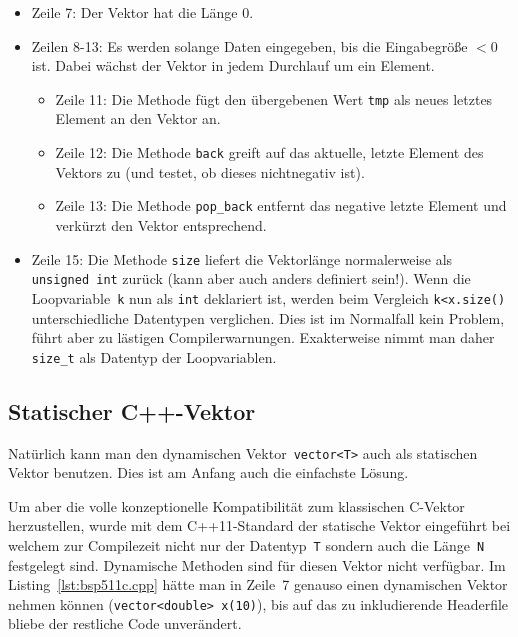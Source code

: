 \begin{itemize}
	\item Zeile 7: Der Vektor hat die Länge 0.
	\item Zeilen 8-13: Es werden solange Daten eingegeben, bis die Eingabegröße $<0$ ist. Dabei wächst der Vektor
	in jedem Durchlauf um ein Element.
	\begin{itemize}
	  \item Zeile 11: Die Methode 
	  fügt den übergebenen Wert \texttt{tmp} als neues letztes Element an den Vektor an.
	  \item Zeile 12: Die Methode \texttt{back} greift auf das aktuelle, letzte Element des Vektors zu (und testet, ob
	  dieses nichtnegativ ist).
	  \item Zeile 13:  Die Methode \texttt{pop\_back} entfernt das negative letzte Element und verkürzt den Vektor
	  entsprechend.
	\end{itemize}
	\item Zeile 15: Die Methode \texttt{size} liefert die Vektorlänge normalerweise als \verb|unsigned int|
	zurück (kann aber auch anders definiert sein!).
	Wenn die Loopvariable~\texttt{k} nun als \verb|int| deklariert ist, werden beim Vergleich \verb|k<x.size()|
	unterschiedliche Datentypen verglichen. Dies ist im Normalfall kein Problem, führt aber zu lästigen
	Compilerwarnungen. Exakterweise nimmt man daher \verb|size_t| als Datentyp der Loopvariablen.
\end{itemize}
%
%
\subsection{Statischer C++-Vektor}
\label{p:5.1.2}
Natürlich kann man den dynamischen Vektor~\texttt{vector<T>} auch als statischen Vektor benutzen.
Dies ist am Anfang auch die einfachste Lösung.

Um aber die volle konzeptionelle Kompatibilität zum klassischen C-Vektor herzustellen, 
wurde mit dem C++11-Standard der statische Vektor
eingeführt bei welchem zur Compilezeit nicht nur der Datentyp~\texttt{T} sondern auch
die Länge~\texttt{N} festgelegt sind. Dynamische Methoden sind für diesen Vektor nicht verfügbar.
%
%
Im Listing~\ref{lst:bsp511c.cpp} hätte man in Zeile~7 genauso einen dynamischen Vektor nehmen können
(\verb|vector<double> x(10)|), bis auf das zu inkludierende Headerfile bliebe der restliche Code unverändert.


